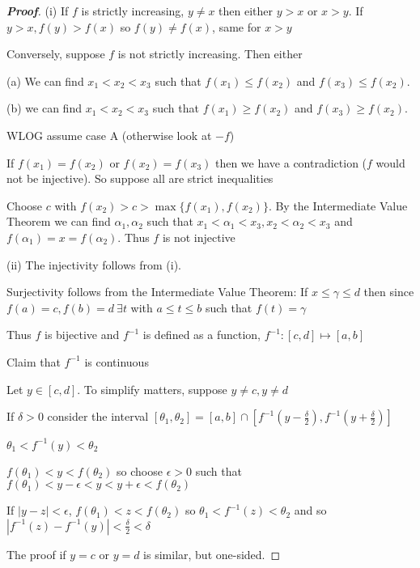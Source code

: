 \begin{proof}[\bf Proof]
\ben
\item [(i)] If $f$ is strictly increasing, $y \neq x$ then either $y > x$ or $x > y$. If $y > x, f(y) > f(x)$ so $f(y) \neq f(x)$, same for $x > y$

Conversely, suppose $f$ is not strictly increasing. Then either
\ben
\item [(a)] We can find $x_1 < x_2 < x_3$ such that $f(x_1) \leq f(x_2)$ and $f(x_3) \leq f(x_2)$.
\item [(b)] we can find $x_1 < x_2 < x_3$ such that $f(x_1) \geq f(x_2)$ and $f(x_3) \geq f(x_2)$.
\een

WLOG assume case A (otherwise look at $-f$)

If $f(x_1) = f(x_2)$ or $f(x_2) = f(x_3)$ then we have a contradiction ($f$ would not be injective). So suppose all are strict inequalities

Choose $c$ with $f(x_2) > c > \max\{f(x_1), f(x_2)\}$. By the Intermediate Value Theorem we can find $\alpha_1, \alpha_2$ such that $x_1 < \alpha_1 < x_3, x_2 < \alpha_2 < x_3$ and $f(\alpha_1) = x = f(\alpha_2)$. Thus $f$ is not injective

\item [(ii)] The injectivity follows from (i).

Surjectivity follows from the Intermediate Value Theorem: If $x \leq \gamma \leq d$ then since $f(a) = c, f(b) = d \ \exists t$ with $a \leq t \leq b$ such that $f(t) = \gamma$

Thus $f$ is bijective and $f^{-1}$ is defined as a function, $f^{-1} : [c, d] \mapsto [a, b]$

Claim that $f^{-1}$ is continuous

Let $y \in [c, d]$. To simplify matters, suppose $y \neq c, y \neq d$

If $\delta > 0$ consider the interval $[\theta_1, \theta_2] = [a, b] \cap [f^{-1}(y - \frac{\delta}{2}), f^{-1}(y + \frac{\delta}{2})]$

$\theta_1 < f^{-1}(y) < \theta_2$

$f(\theta_1) < y < f(\theta_2)$ so choose $\epsilon > 0$ such that $f(\theta_1) < y - \epsilon < y < y + \epsilon < f(\theta_2)$

If $|y-z| < \epsilon$, $f(\theta_1) < z < f(\theta_2)$ so $\theta_1 < f^{-1}(z) < \theta_2$ and so $|f^{-1}(z) - f^{-1}(y)| < \frac{\delta}{2} < \delta$

The proof if $y = c$ or $y = d$ is similar, but one-sided.
\een
\end{proof}

